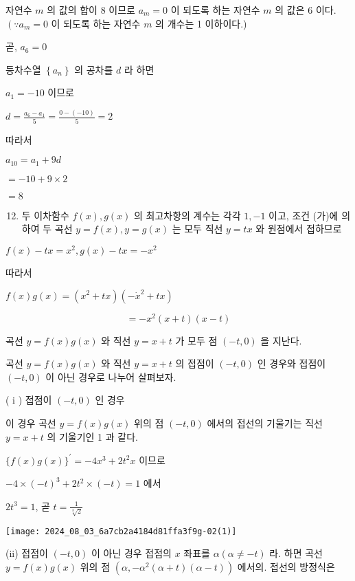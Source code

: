 \documentclass[10pt]{article}
\begin{document}
자연수 \(m\) 의 값의 합이 8 이므로 \(a_{m}=0\) 이 되도록 하는 자연수 \(m\) 의 값은 6 이다. \(\left(\because a_{m}=0\right.\) 이 되도록 하는 자연수 \(m\) 의 개수는 1 이하이다.)

곧, \(a_{6}=0\)

등차수열 \(\left\{a_{n}\right\}\) 의 공차를 \(d\) 라 하면

\(a_{1}=-10\) 이므로

\(d=\frac{a_{6}-a_{1}}{5}=\frac{0-(-10)}{5}=2\)

따라서

\(a_{10}=a_{1}+9 d\)

\(=-10+9 \times 2\)

\(=8\)

\begin{enumerate}
  \setcounter{enumi}{11}
  \item 두 이차함수 \(f(x), g(x)\) 의 최고차항의 계수는 각각 \(1,-1\) 이고, 조건 (가)에 의하여 두 곡선 \(y=f(x), y=g(x)\) 는 모두 직선 \(y=t x\) 와 원점에서 접하므로
\end{enumerate}

\(f(x)-t x=x^{2}, g(x)-t x=-x^{2}\)

따라서

\(f(x) g(x)=\left(x^{2}+t x\right)\left(-\dot{x}^{2}+t x\right)\)

\[
=-x^{2}(x+t)(x-t)
\]

곡선 \(y=f(x) g(x)\) 와 직선 \(y=x+t\) 가 모두 점 \((-t, 0)\) 을 지난다.

곡선 \(y=f(x) g(x)\) 와 직선 \(y=x+t\) 의 접점이 \((-t, 0)\) 인 경우와 접점이 \((-t, 0)\) 이 아닌 경우로 나누어 살펴보자.

( i ) 접점이 \((-t, 0)\) 인 경우

이 경우 곡선 \(y=f(x) g(x)\) 위의 점 \((-t, 0)\) 에서의 접선의 기울기는 직선 \(y=x+t\) 의 기울기인 1 과 같다.

\(\{f(x) g(x)\}^{\prime}=-4 x^{3}+2 t^{2} x\) 이므로

\(-4 \times(-t)^{3}+2 t^{2} \times(-t)=1\) 에서

\(2 t^{3}=1\), 곧 \(t=\frac{1}{\sqrt[3]{2}}\)

\begin{center}
\texttt{[image: 2024\_08\_03\_6a7cb2a4184d81ffa3f9g-02(1)]}
\end{center}

(ii) 접점이 \((-t, 0)\) 이 아닌 경우 접점의 \(x\) 좌표를 \(\alpha(\alpha \neq-t)\) 라. 하면 곡선 \(y=f(x) g(x)\) 위의 점 \(\left(\alpha,-\alpha^{2}(\alpha+t)(\alpha-t)\right)\) 에서의. 접선의 방정식은
\end{document}
